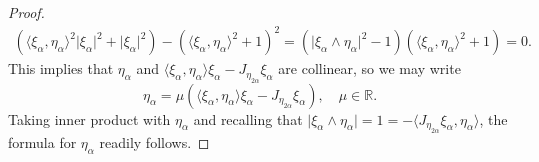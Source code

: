 \documentclass[10pt,a4paper]{amsart}
\newcommand{\R}{\mathbb{R}}
\begin{document}
\begin{proof}
\begin{align*}
(\langle\xi_\alpha,\eta_\alpha\rangle^2\lvert\xi_\alpha\rvert^2+\lvert \xi_\alpha\rvert^2)
-(\langle\xi_\alpha,\eta_\alpha\rangle^2+1)^2
=(\lvert\xi_\alpha\wedge\eta_\alpha\rvert^2-1)(\langle\xi_\alpha,\eta_\alpha\rangle^2+1)=0.
\end{align*}
This implies that $\eta_\alpha$ and $\langle\xi_\alpha,\eta_\alpha\rangle\xi_\alpha-J_{\eta_{2\alpha}}\xi_\alpha$ are collinear, so we may write
\begin{equation*}
\eta_\alpha=\mu(\langle\xi_\alpha,\eta_\alpha\rangle\xi_\alpha-J_{\eta_{2\alpha}}\xi_\alpha), \quad \mu\in \R.
\end{equation*}
Taking inner product with $\eta_\alpha$ and recalling that
$\lvert\xi_\alpha\wedge\eta_\alpha\rvert=1=-\langle J_{\eta_{2\alpha}}\xi_\alpha,\eta_\alpha\rangle$,
the formula for $\eta_\alpha$ readily follows.\qedhere
\end{proof}
\end{document}
